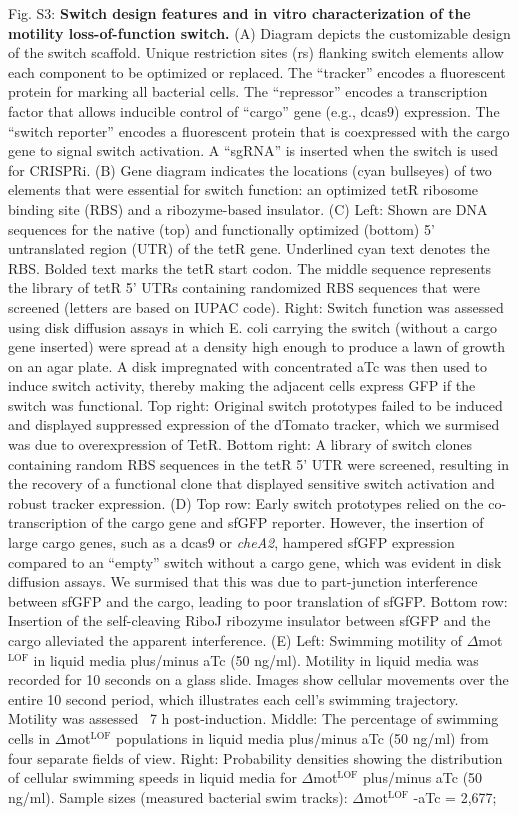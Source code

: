 Fig. S3: \textbf{Switch design features and in vitro characterization of the motility loss-of-function switch.} (A) Diagram depicts the customizable design of the switch scaffold. Unique restriction sites (rs) flanking switch elements allow each component to be optimized or replaced. The ``tracker'' encodes a fluorescent protein for marking all bacterial cells. The ``repressor'' encodes a transcription factor that allows inducible control of ``cargo'' gene (e.g., dcas9) expression. The ``switch reporter'' encodes a fluorescent protein that is coexpressed with the cargo gene to signal switch activation. A ``sgRNA'' is inserted when the switch is used for CRISPRi. (B) Gene diagram indicates the locations (cyan bullseyes) of two elements that were essential for switch function: an optimized tetR ribosome binding site (RBS) and a ribozyme-based insulator. (C) Left: Shown are DNA sequences for the native (top) and functionally optimized (bottom) 5' untranslated region (UTR) of the tetR gene. Underlined cyan text denotes the RBS. Bolded text marks the tetR start codon. The middle sequence represents the library of tetR 5' UTRs containing randomized RBS sequences that were screened (letters are based on IUPAC code). Right: Switch function was assessed using disk diffusion assays in which E. coli carrying the switch (without a cargo gene inserted) were spread at a density high enough to produce a lawn of growth on an agar plate. A disk impregnated with concentrated aTc was then used to induce switch activity, thereby making the adjacent cells express GFP if the switch was functional. Top right: Original switch prototypes failed to be induced and displayed suppressed expression of the dTomato tracker, which we surmised was due to overexpression of TetR. Bottom right: A library of switch clones containing random RBS sequences in the tetR 5' UTR were screened, resulting in the recovery of a functional clone that displayed sensitive switch activation and robust tracker expression. (D) Top row: Early switch prototypes relied on the co-transcription of the cargo gene and sfGFP reporter. However, the insertion of large cargo genes, such as a dcas9 or \textit{cheA2}, hampered sfGFP expression compared to an ``empty'' switch without a cargo gene, which was evident in disk diffusion assays. We surmised that this was due to part-junction interference between sfGFP and the cargo, leading to poor translation of sfGFP. Bottom row: Insertion of the self-cleaving RiboJ ribozyme insulator between sfGFP and the cargo alleviated the apparent interference. (E) Left: Swimming motility of $\Delta$mot$^{\text{LOF}}$ in liquid media plus/minus aTc (50 ng/ml). Motility in liquid media was recorded for 10 seconds on a glass slide. Images show cellular movements over the entire 10 second period, which illustrates each cell's swimming trajectory. Motility was assessed ~7 h post-induction. Middle: The percentage of swimming cells in $\Delta$mot$^{\text{LOF}}$ populations in liquid media plus/minus aTc (50 ng/ml) from four separate fields of view. Right: Probability densities showing the distribution of cellular swimming speeds in liquid media for $\Delta$mot$^{\text{LOF}}$ plus/minus aTc (50 ng/ml). Sample sizes (measured bacterial swim tracks): $\Delta$mot$^{\text{LOF}}$ -aTc = 2,677; 